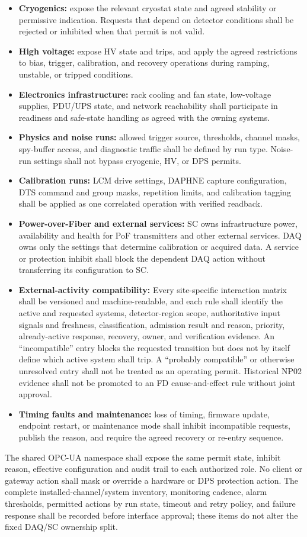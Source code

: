 \begin{itemize}[nosep]
  \item \textbf{Cryogenics:} expose the relevant cryostat state and agreed stability or permissive indication. Requests that depend on detector conditions shall be rejected or inhibited when that permit is not valid.
  \item \textbf{High voltage:} expose HV state and trips, and apply the agreed restrictions to bias, trigger, calibration, and recovery operations during ramping, unstable, or tripped conditions.
  \item \textbf{Electronics infrastructure:} rack cooling and fan state, low-voltage supplies, PDU/UPS state, and network reachability shall participate in readiness and safe-state handling as agreed with the owning systems.
  \item \textbf{Physics and noise runs:} allowed trigger source, thresholds, channel masks, spy-buffer access, and diagnostic traffic shall be defined by run type. Noise-run settings shall not bypass cryogenic, HV, or DPS permits.
  \item \textbf{Calibration runs:} LCM drive settings, DAPHNE capture configuration, DTS command and group masks, repetition limits, and calibration tagging shall be applied as one correlated operation with verified readback.
  \item \textbf{Power-over-Fiber and external services:} SC owns infrastructure power, availability and health for PoF transmitters and other external services. DAQ owns only the settings that determine calibration or acquired data. A service or protection inhibit shall block the dependent DAQ action without transferring its configuration to SC.
  \item \textbf{External-activity compatibility:} Every site-specific interaction matrix shall be versioned and machine-readable, and each rule shall identify the active and requested systems, detector-region scope, authoritative input signals and freshness, classification, admission result and reason, priority, already-active response, recovery, owner, and verification evidence. An ``incompatible'' entry blocks the requested transition but does not by itself define which active system shall trip. A ``probably compatible'' or otherwise unresolved entry shall not be treated as an operating permit. Historical NP02 evidence shall not be promoted to an FD cause-and-effect rule without joint approval.
  \item \textbf{Timing faults and maintenance:} loss of timing, firmware update, endpoint restart, or maintenance mode shall inhibit incompatible requests, publish the reason, and require the agreed recovery or re-entry sequence.
\end{itemize}

The shared OPC-UA namespace shall expose the same permit state, inhibit reason, effective configuration and audit trail to each authorized role. No client or gateway action shall mask or override a hardware or DPS protection action. The complete installed-channel/system inventory, monitoring cadence, alarm thresholds, permitted actions by run state, timeout and retry policy, and failure response shall be recorded before interface approval; these items do not alter the fixed DAQ/SC ownership split.
